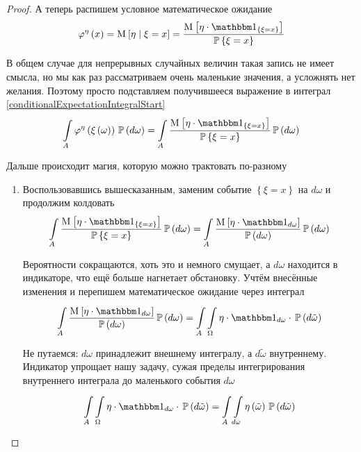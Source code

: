 \begin{proof}
А теперь распишем условное математическое ожидание
$$\varphi^{\eta}\left( x \right)
    = \Mean{\eta \mcond \xi = x}
    = \frac{\Mean{\eta \cdot \Indicatorof{\xi = x}}}{\Probability{\xi = x}}$$

В общем случае для непрерывных случайных величин такая запись не имеет смысла,
но мы как раз рассматриваем очень маленькие значения,
а усложнять нет желания.
Поэтому просто подставляем получившееся выражение
в интеграл \eqref{conditionalExpectationIntegralStart}
\begin{equation}\label{conditionalExpectationMagic}
    \integrall{A}{\probability{d\omega}}{
        \varphi^{\eta}\left( \xi\left( \omega \right) \right)}
        = \integrall{A}{\probability{d\omega}}{
            \frac{\Mean{\eta \cdot \Indicatorof{\xi=x}}}{\Probability{\xi = x}}}
\end{equation}


Дальше происходит магия, которую можно трактовать по-разному
\begin{enumerate}[label=\bfseries Формулировка \arabic*:]
    \item
        Воспользовавшись вышесказанным,
        заменим событие $\left\{ \xi = x \right\}$
        на $d\omega$ и продолжим колдовать
        $$\integrall{A}{\probability{d\omega}}{
            \frac{\Mean{\eta \cdot \Indicatorof{\xi = x}}}
                {\Probability{\xi = x}}}
            = \integrall{A}{\probability{d\omega}}{
                \frac{\Mean{ \eta \cdot \indicatorof{d\omega} }}
                    {\probability{d\omega}}}$$

        Вероятности сокращаются, хоть это и немного смущает,
        а $d\omega$ находится в индикаторе, что ещё больше нагнетает обстановку.
        Учтём внесённые изменения и перепишем
        математическое ожидание через интеграл
        $$\integrall{A}{\probability{d\omega}}{
            \frac{\Mean{ \eta \cdot \indicatorof{d\omega} }}
                {\probability{d\omega}}}
            = \int\limits_A \integrall{\Omega}{\probability{d\tilde{\omega}}}{
                \eta \cdot \indicatorof{d\omega} \cdot}$$

        Не путаемся: $d\omega$ принадлежит внешнему интегралу,
        а $d\tilde{\omega}$ внутреннему.
        Индикатор упрощает нашу задачу,
        сужая пределы интегрирования внутреннего интеграла
        до маленького события $d\omega$
        $$\int\limits_A \integrall{\Omega}{\probability{d\tilde{\omega}}}{
                \eta \cdot \indicatorof{d\omega} \cdot}
                = \int\limits_A \integrall{d\omega}
                    {\probability{d\tilde{\omega}}}
                    {\eta\left( \tilde{\omega}\right)}$$


\end{enumerate}
\end{proof}
